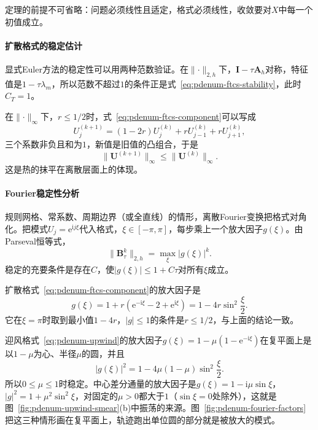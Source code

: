 定理的前提不可省略：问题必须线性且适定，格式必须线性，收敛要对$X$中每一个初值成立。

\paragraph{扩散格式的稳定估计}
显式Euler方法的稳定性可以用两种范数验证。在$\lVert\cdot\rVert_{2,h}$下，$\bm{I}-\tau\bm{A}_h$对称，特征值是$1-\tau\lambda_m$，所以范数不超过$1$的条件正是式~\eqref{eq:pdenum-ftcs-stability}，此时$C_T=1$。

在$\lVert\cdot\rVert_\infty$下，$r\leq1/2$时，式~\eqref{eq:pdenum-ftcs-component}可以写成
\[
 U_j^{(k+1)}=(1-2r)U_j^{(k)}+rU_{j-1}^{(k)}+rU_{j+1}^{(k)},
\]
三个系数非负且和为$1$，新值是旧值的凸组合，于是
\[
 \lVert\bm{U}^{(k+1)}\rVert_\infty\leq\lVert\bm{U}^{(k)}\rVert_\infty .
\]
这是热的抹平在离散层面上的体现。

\paragraph{Fourier稳定性分析}
规则网格、常系数、周期边界（或全直线）的情形，离散Fourier变换把格式对角化。把模式$U_j=\mathrm{e}^{\mathrm{i}j\xi}$代入格式，$\xi\in[-\pi,\pi]$，每步乘上一个放大因子$g(\xi)$。由Parseval恒等式，
\begin{equation}
 \lVert\bm{B}_\tau^k\rVert_{2,h}=\max_\xi\lvert g(\xi)\rvert^k .
 \label{eq:pdenum-von-neumann}
\end{equation}
稳定的充要条件是存在$C$，使$\lvert g(\xi)\rvert\leq1+C\tau$对所有$\xi$成立。

扩散格式~\eqref{eq:pdenum-ftcs-component}的放大因子是
\[
 g(\xi)=1+r(\mathrm{e}^{-\mathrm{i}\xi}-2+\mathrm{e}^{\mathrm{i}\xi})=1-4r\sin^2\frac{\xi}{2} .
\]
它在$\xi=\pi$时取到最小值$1-4r$，$\lvert g\rvert\leq1$的条件是$r\leq1/2$，与上面的结论一致。

迎风格式~\eqref{eq:pdenum-upwind}的放大因子$g(\xi)=1-\mu(1-\mathrm{e}^{-\mathrm{i}\xi})$在复平面上是以$1-\mu$为心、半径$\mu$的圆，并且
\begin{equation}
 \lvert g(\xi)\rvert^2=1-4\mu(1-\mu)\sin^2\frac{\xi}{2} .
 \label{eq:pdenum-upwind-factor}
\end{equation}
所以$0\leq\mu\leq1$时稳定。中心差分通量的放大因子是$g(\xi)=1-\mathrm{i}\mu\sin\xi$，$\lvert g\rvert^2=1+\mu^2\sin^2\xi$，对固定的$\mu>0$都大于$1$（$\sin\xi=0$处除外），这就是图~\ref{fig:pdenum-upwind-smear}(b)中振荡的来源。图~\ref{fig:pdenum-fourier-factors}把这三种情形画在复平面上，轨迹跑出单位圆的部分就是被放大的模式。

